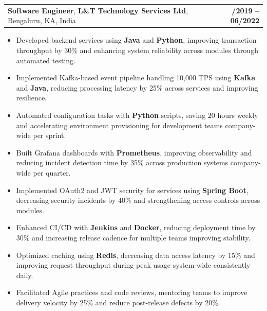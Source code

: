 \documentclass[letterpaper,11pt]{article}
\makeatletter
\newcommand{\resumeItem}[1]{
  \item\footnotesize{
    {#1 \vspace{-2pt}}
  }
}
\newcommand{\resumeSubheading}[4]{
  \vspace{-2pt}\item
    \begin{tabular*}{1.0\textwidth}[t]{l@{\extracolsep{\fill}}r}
      \textbf{\fontsize{10pt}{14pt}\selectfont #3}, \textbf{\fontsize{10pt}{14pt}\selectfont #1}, \fontsize{10pt}{14pt}\selectfont #4 & \textbf{\fontsize{10pt}{14pt}\selectfont #2} \\
    \end{tabular*}\vspace{-7pt}
}
\newcommand{\resumeItemListStart}{\begin{itemize}[leftmargin=*]}
\newcommand{\resumeItemListEnd}{\end{itemize}\vspace{-5pt}}
\makeatother
\begin{document}
    \resumeSubheading
        {L\&T Technology Services Ltd}{08/2019 -- 06/2022}
        {Software Engineer}{Bengaluru, KA, India}
      \resumeItemListStart
        \resumeItem{Developed backend services using \textbf{Java} and \textbf{Python}, improving transaction throughput by 30\% and enhancing system reliability across modules through automated testing.}
        \resumeItem{Implemented Kafka-based event pipeline handling 10,000 TPS using \textbf{Kafka} and \textbf{Java}, reducing processing latency by 25\% across services and improving resilience.}
        \resumeItem{Automated configuration tasks with \textbf{Python} scripts, saving 20 hours weekly and accelerating environment provisioning for development teams company-wide per sprint.}
        \resumeItem{Built Grafana dashboards with \textbf{Prometheus}, improving observability and reducing incident detection time by 35\% across production systems company-wide per quarter.}
        \resumeItem{Implemented OAuth2 and JWT security for services using \textbf{Spring Boot}, decreasing security incidents by 40\% and strengthening access controls across modules.}
        \resumeItem{Enhanced CI/CD with \textbf{Jenkins} and \textbf{Docker}, reducing deployment time by 30\% and increasing release cadence for multiple teams improving stability.}
        \resumeItem{Optimized caching using \textbf{Redis}, decreasing data access latency by 15\% and improving request throughput during peak usage system-wide consistently daily.}
        \resumeItem{Facilitated Agile practices and code reviews, mentoring teams to improve delivery velocity by 25\% and reduce post-release defects by 20\%.}
      \resumeItemListEnd
\end{document}
